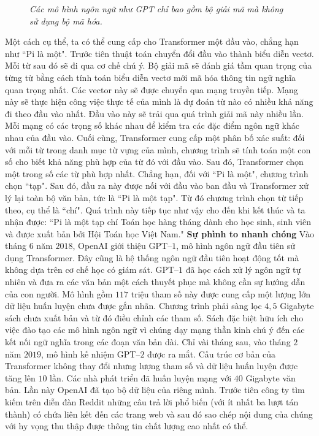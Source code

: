 \begin{multicols}{2}
\begin{figure}[H]
		\caption{\small\textit{\color{timhieukhoahoc}Các mô hình ngôn ngữ như GPT chỉ bao gồm bộ giải mã mà không sử dụng bộ mã hóa.}}
		\vspace*{-10pt}
	\end{figure}
	Một cách cụ thể, ta có thể cung cấp cho Transformer một đầu vào, chẳng hạn như ``Pi là một". Trước tiên thuật toán chuyển đổi đầu vào thành biểu diễn vectơ. Mỗi từ sau đó sẽ đi qua cơ chế chú ý. Bộ giải mã sẽ đánh giá tầm quan trọng của từng từ bằng cách tính toán biểu diễn vectơ mới mã hóa thông tin ngữ nghĩa quan trọng nhất. Các vector này sẽ được chuyển qua mạng truyền tiếp. Mạng này sẽ thực hiện công việc thực tế của mình là dự đoán từ nào có nhiều khả năng đi theo đầu vào nhất. 
	\vskip 0.1cm
	Đầu vào này sẽ trải qua quá trình giải mã này nhiều lần. Mỗi mạng có các trọng số khác nhau để kiểm tra các đặc điểm ngôn ngữ khác nhau của đầu vào. Cuối cùng, Transformer cung cấp một phân bố xác suất: đối với mỗi từ trong danh mục từ vựng của mình, chương trình sẽ tính toán một con số cho biết khả năng phù hợp của từ đó với đầu vào. Sau đó, Transformer chọn một trong số các từ phù hợp nhất. Chẳng hạn, đối với ``Pi là một", chương trình chọn ``tạp". Sau đó, đầu ra này được nối với đầu vào ban đầu và Transformer xử lý lại toàn bộ văn bản, tức là ``Pi là một tạp". Từ đó chương trình chọn từ tiếp theo, cụ thể là ``chí". Quá trình này tiếp tục như vậy cho đến khi kết thúc và ta nhận được: ``Pi là một tạp chí Toán học hàng tháng dành cho học sinh, sinh viên và được xuất bản bởi Hội Toán học Việt Nam."
	\vskip 0.1cm
	\textbf{\color{timhieukhoahoc}Sự phình to nhanh chóng}
	\vskip 0.1cm
	Vào tháng $6$ năm $2018$, OpenAI giới thiệu GPT--$1$, mô hình ngôn ngữ đầu tiên sử dụng Transformer. Đây cũng là hệ thống ngôn ngữ đầu tiên hoạt động tốt mà không dựa trên cơ chế học có giám sát. GPT--$1$ đã học cách xử lý ngôn ngữ tự nhiên và đưa ra các văn bản một cách thuyết phục mà không cần sự hướng dẫn của con người. Mô hình gồm $117$ triệu tham số  này được cung cấp một lượng lớn dữ liệu huấn luyện chưa được gắn nhãn. Chương trình phải sàng lọc $4,5$ Gigabyte sách chưa xuất bản và từ đó điều chỉnh các tham số. Sách đặc biệt hữu ích cho việc đào tạo các mô hình ngôn ngữ vì chúng dạy mạng thần kinh chú ý đến các kết nối ngữ nghĩa trong các đoạn văn bản dài.
	\vskip 0.1cm
	Chỉ vài tháng sau, vào tháng $2$ năm $2019$, mô hình kế nhiệm GPT--$2$ được ra mắt. Cấu trúc cơ bản của Transformer không thay đổi nhưng lượng tham số và dữ liệu huấn luyện được tăng lên $10$ lần. Các nhà phát triển đã huấn luyện mạng với $40$ Gigabyte văn bản. Lần này OpenAI đã tạo bộ dữ liệu của riêng mình. Trước tiên công ty tìm kiếm trên diễn đàn Reddit những câu trả lời phổ biến (với ít nhất ba lượt tán thành) có chứa liên kết đến các trang web và sau đó sao chép nội dung của chúng với hy vọng thu thập được thông tin chất lượng cao nhất có thể.

\end{multicols}
